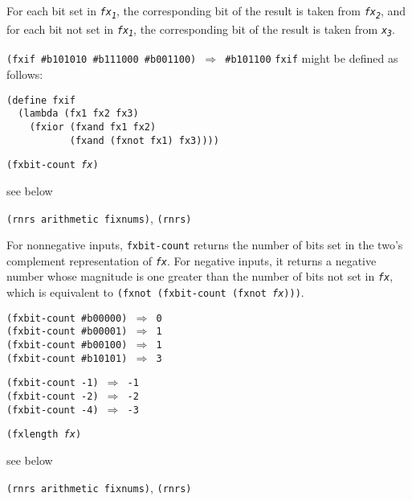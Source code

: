 For each bit set in \texttt{\textit{fx\textsubscript{1}}}, the corresponding bit of the result
is taken from \texttt{\textit{fx\textsubscript{2}}}, and for each bit not set in \texttt{\textit{fx\textsubscript{1}}},
the corresponding bit of the result is taken from \texttt{\textit{x\textsubscript{3}}}.


\texttt{(fxif \#{}b101010 \#{}b111000 \#{}b001100) \(\Rightarrow\) \#{}b101100}
\texttt{fxif} might be defined as follows:

\begin{alltt}
(define fxif
  (lambda (fx1 fx2 fx3)
    (fxior (fxand fx1 fx2)
           (fxand (fxnot fx1) fx3))))
\end{alltt}

\begin{description}

\label{objects_s165}\item[procedure] \texttt{(fxbit-count \textit{fx})}



\item[returns] see below


\item[libraries] \texttt{(rnrs arithmetic fixnums)}, \texttt{(rnrs)}
\end{description}


For nonnegative inputs, \texttt{fxbit-count} returns the number of bits
set in the two's complement representation of \texttt{\textit{fx}}.
For negative inputs, it returns a negative number whose magnitude is one
greater than the number of bits not set in \texttt{\textit{fx}}, which is equivalent to
\texttt{(fxnot (fxbit-count (fxnot \textit{fx})))}.


\begin{alltt}
(fxbit-count \#{}b00000) \(\Rightarrow\) 0
(fxbit-count \#{}b00001) \(\Rightarrow\) 1
(fxbit-count \#{}b00100) \(\Rightarrow\) 1
(fxbit-count \#{}b10101) \(\Rightarrow\) 3

(fxbit-count -1) \(\Rightarrow\) -1
(fxbit-count -2) \(\Rightarrow\) -2
(fxbit-count -4) \(\Rightarrow\) -3
\end{alltt}

\begin{description}

\label{objects_s166}\item[procedure] \texttt{(fxlength \textit{fx})}



\item[returns] see below


\item[libraries] \texttt{(rnrs arithmetic fixnums)}, \texttt{(rnrs)}
\end{description}


